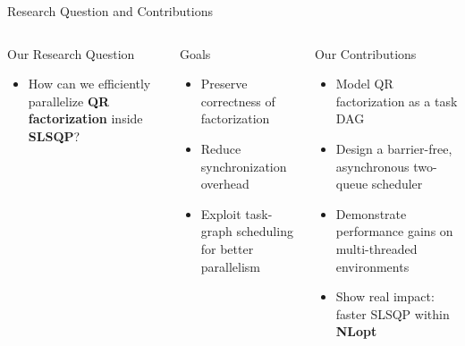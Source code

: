 \begin{frame}{Research Question and Contributions}
	\pause 
	\begin{columns}[c,onlytextwidth] %
	
		\begin{block}{Our Research Question}
		  \begin{itemize}\setlength{\itemsep}{6pt}
		    \item How can we efficiently parallelize \textbf{QR factorization} inside \textbf{SLSQP}?
		  \end{itemize}
		\end{block}
		
		\pause 
		\begin{block}{Goals}
		  \begin{itemize}\setlength{\itemsep}{4pt}
		    \item Preserve correctness of factorization
		    \item Reduce synchronization overhead
		    \item Exploit task-graph scheduling for better parallelism
		  \end{itemize}
		\end{block}
		
		\pause 
		\begin{block}{Our Contributions}
		  \begin{itemize}\setlength{\itemsep}{6pt}
		    \item Model QR factorization as a task DAG
		    \item Design a barrier-free, asynchronous two-queue scheduler
		    \item Demonstrate performance gains on multi-threaded environments
		    \item Show real impact: faster SLSQP within \textbf{NLopt}
		  \end{itemize}
		\end{block}
	
	\end{columns}
\end{frame}
